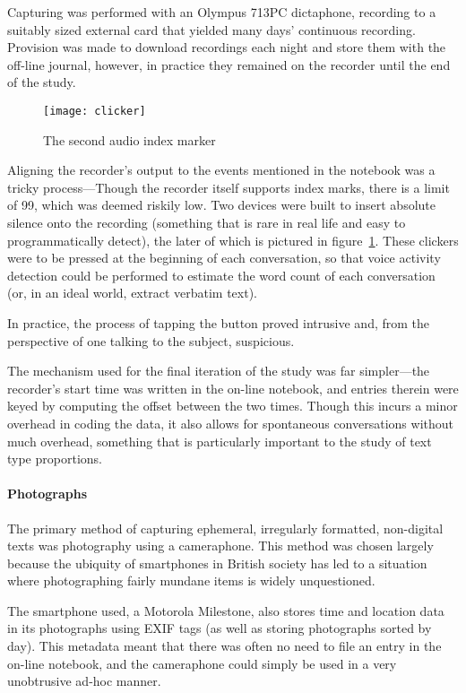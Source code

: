 Capturing was performed with an Olympus 713PC dictaphone, recording to a suitably sized external card that yielded many days' continuous recording.  Provision was made to download recordings each night and store them with the off-line journal, however, in practice they remained on the recorder until the end of the study.


\begin{figure}[p]
\centering
\texttt{[image: clicker]}
\caption{The second audio index marker}
\label{fig:personal:clicker}
\end{figure}


Aligning the recorder's output to the events mentioned in the notebook was a tricky process---Though the recorder itself supports index marks, there is a limit of 99, which was deemed riskily low.  Two devices were built to insert absolute silence onto the recording (something that is rare in real life and easy to programmatically detect), the later of which is pictured in figure~\ref{fig:personal:clicker}.  These clickers were to be pressed at the beginning of each conversation, so that voice activity detection could be performed to estimate the word count of each conversation (or, in an ideal world, extract verbatim text).

In practice, the process of tapping the button proved intrusive and, from the perspective of one talking to the subject, suspicious.

The mechanism used for the final iteration of the study was far simpler---the recorder's start time was written in the on-line notebook, and entries therein were keyed by computing the offset between the two times.  Though this incurs a minor overhead in coding the data, it also allows for spontaneous conversations without much overhead, something that is particularly important to the study of text type proportions.



\paragraph{Photographs}
The primary method of capturing ephemeral, irregularly formatted, non-digital texts was photography using a cameraphone.  This method was chosen largely because the ubiquity of smartphones in British society has led to a situation where photographing fairly mundane items is widely unquestioned.

The smartphone used, a Motorola Milestone, also stores time and location data in its photographs using EXIF tags (as well as storing photographs sorted by day).  This metadata meant that there was often no need to file an entry in the on-line notebook, and the cameraphone could simply be used in a very unobtrusive ad-hoc manner.

